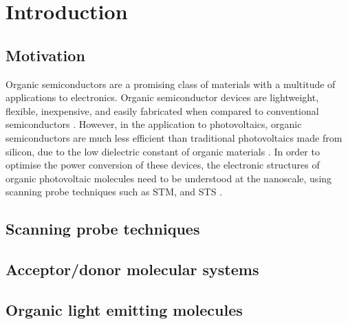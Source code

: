 
\chapter{Introduction}
\label{ch:Introduction}

\section{Motivation}



Organic semiconductors are a promising class of materials with a multitude of applications to electronics. Organic semiconductor devices are lightweight, flexible, inexpensive, and easily fabricated when compared to conventional semiconductors \citep{lewis2007toward}. However, in the application to photovoltaics, organic semiconductors are much less efficient than traditional photovoltaics made from silicon, due to the low dielectric constant of organic materials \citep{gregg2003comparing}. In order to optimise the power conversion of these devices, the electronic structures of organic photovoltaic molecules need to be understood at the nanoscale, using scanning probe techniques such as \ac{STM}, and \ac{STS} \citep{binnig1982surface}. 



\section{Scanning probe techniques}




\section{Acceptor/donor molecular systems}


\section{Organic light emitting molecules}








